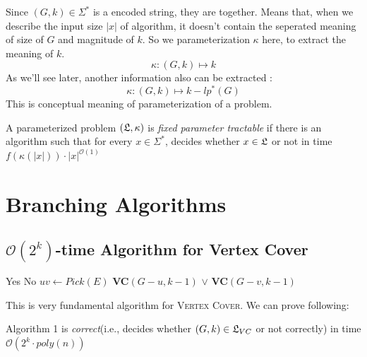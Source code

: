 \documentclass[12pt, a4paper, openany, twoside]{book}
\theoremstyle{definition}
\theoremstyle{remark}
\newcommand{\CO}{{\mathcal {O}}} \newcommand{\CP}{{\mathcal {P}}}
\theoremstyle{plain}
\numberwithin{equation}{section}
\begin{document}
Since $(G, k) \in \Sigma^*$ is a encoded string, they are together. Means that, when we describe the input size $|x|$ of algorithm, 
it doesn't contain the seperated meaning of size of $G$ and magnitude of $k$. So we parameterization $\kappa$ here, to extract the meaning of $k$. 
\[\kappa : (G, k) \mapsto k\] 
As we'll see later, another information also can be extracted : 
\[\kappa : (G, k) \mapsto k - lp^*(G)\]
This is conceptual meaning of parameterization of a problem. 

\begin{tcolorbox}[colback=yellow!10!white,colframe=brown!75!black,title=Fixed Parameter Tractable]

A parameterized problem $({\mathfrak{L}}, \kappa)$ is \textit{fixed parameter tractable} if there is an algorithm such that 
for every $x \in \Sigma^*$, decides whether $x \in {\mathfrak{L}}$ or not in time $f(\kappa(|x|))\cdot |x|^{\CO(1)}$

\end{tcolorbox}

\newpage 

\chapter{Branching Algorithms}

\section{$\CO(2^k)$-time Algorithm for Vertex Cover}

\begin{algorithm}

\caption{$\CO(2^k)$-time Algorithm for Vertex Cover}

\begin{algorithmic}[1]
    \Return Yes
    \Return No 
\Else   
\State $uv \gets Pick(E)$ 
\State \Return \textbf{VC}$(G - u, k - 1)$ $\vee$ \textbf{VC}$(G - v, k - 1)$
\EndIf
\EndProcedure
\end{algorithmic}

\end{algorithm}

This is very fundamental algorithm for \textsc{Vertex Cover}. We can prove following: 

\begin{tcolorbox}[colback=yellow!10!white,colframe=green!75!black,title=Algorithm 1]

Algorithm 1 is \textit{correct}(i.e., decides whether $(G, k) \in {\mathfrak{L}}_{VC}$ or not correctly) in time $\CO(2^k \cdot poly(n))$

\end{tcolorbox}
\end{document}
